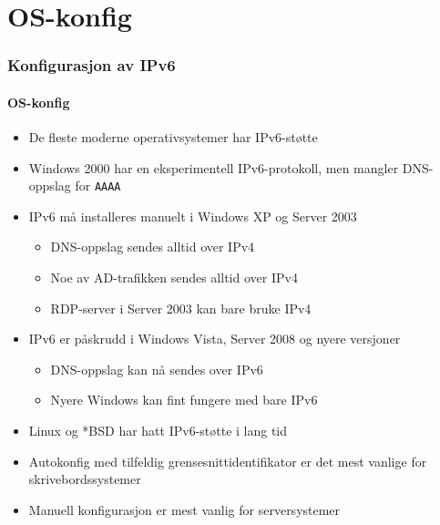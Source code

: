 \section{OS-konfig}
\begin{frame}%
  \frametitle{Konfigurasjon av IPv6}
  \framesubtitle{OS-konfig}
  \pause
  \begin{itemize}[<+->]
  \item De fleste moderne operativsystemer har IPv6-støtte
  \item Windows 2000 har en eksperimentell IPv6-protokoll, men mangler
    DNS-oppslag for \texttt{AAAA}
  \item IPv6 må installeres manuelt i Windows XP og Server 2003
    \begin{itemize}[<+->]
    \item DNS-oppslag sendes alltid over \alert{IPv4}
    \item Noe av AD-trafikken sendes alltid over \alert{IPv4}
    \item RDP-server i Server 2003 kan bare bruke \alert{IPv4}
    \end{itemize}
  \item IPv6 er påskrudd i Windows Vista, Server 2008 og nyere versjoner
    \begin{itemize}[<+->]
    \item DNS-oppslag kan nå sendes over IPv6
    \item Nyere Windows kan fint fungere med bare IPv6
    \end{itemize}
  \item Linux og *BSD har hatt IPv6-støtte i lang tid
  \item Autokonfig med tilfeldig grensesnittidentifikator er det mest
    vanlige for skrivebordssystemer
  \item Manuell konfigurasjon er mest vanlig for serversystemer
  \end{itemize}
\end{frame}

